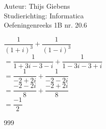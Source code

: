 \documentclass[a4paper]{article}
\begin{document}
\noindent \large Auteur: Thijs Giebens \\
\noindent \large Studierichting: Informatica\\
\noindent \large Oefeningenreeks 1B nr. 20.6\\

\medskip

\normalsize



$\dfrac{1}{(1+i)^3} + \dfrac{1}{(1-i)^3}$\\

$= \dfrac{1}{1+3i-3-i} + \dfrac{1}{1-3i-3+i}$\\

$= \dfrac{1}{-2+2i} + \dfrac{1}{-2-2i}$\\

$= \dfrac{-2-2i}{8} + \dfrac{-2+2i}{8}$\\

$= \dfrac{-1}{2}$\\


\begin{thebibliography}{999}
\end{thebibliography}
\end{document}
